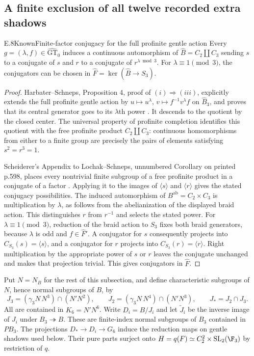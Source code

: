 \subsection{A finite exclusion of all twelve recorded extra shadows}

\begin{statement}{E.8}{Known}{Finite-factor conjugacy for the full profinite gentle action}
Every $g=(\lambda,f)\in\widehat{\mathrm{GT}}_0$ induces a continuous
automorphism of $\widehat B=C_2\amalg C_3$ sending $s$ to a conjugate
of $s$ and $r$ to a conjugate of $r^{\lambda\bmod3}$.
For $\lambda\equiv1\pmod3$, the conjugators can be chosen in
$\widehat F=\ker(\widehat B\to S_3)$.
\end{statement}
\begin{proof}
Harbater--Schneps, Proposition 4, proof of $(i)\Rightarrow(iii)$,
explicitly extends the full profinite gentle action by
$u\mapsto u^\lambda$, $v\mapsto f^{-1}v^\lambda f$ on
$\widehat B_3$, and proves that its central generator goes to its
$\lambda$th power \cite{DE_HarbaterSchneps2000}.
It descends to the quotient by the closed center. The universal
property of profinite completion identifies this quotient with the
free profinite product $C_2\amalg C_3$: continuous homomorphisms
from either to a finite group are precisely the pairs of elements
satisfying $s^2=r^3=1$.

Scheiderer's Appendix to Lochak--Schneps, unnumbered Corollary on
printed p.598, places every nontrivial finite subgroup of a free
profinite product in a conjugate of a factor
\cite{DE_LochakSchneps1997}. Applying it to the images of
$\langle s\rangle$ and $\langle r\rangle$ gives the stated conjugacy
possibilities. The induced automorphism of
$B^{\mathrm{ab}}=C_2\times C_3$ is multiplication by $\lambda$,
as follows from the abelianization of the displayed braid action.
This distinguishes $r$ from $r^{-1}$ and selects the stated power.
For $\lambda\equiv1\pmod3$, reduction of the braid action to $S_3$
fixes both braid generators, because $\lambda$ is odd and
$f\in\widehat F'$. A conjugator for $s$ consequently projects into
$C_{S_3}(s)=\langle s\rangle$, and a conjugator for $r$ projects
into $C_{S_3}(r)=\langle r\rangle$. Right multiplication by the
appropriate power of $s$ or $r$ leaves the conjugate unchanged and
makes that projection trivial. This gives conjugators in $\widehat F$.
\end{proof}

Put $N=N_B$ for the rest of this subsection, and define characteristic
subgroups of $N$, hence normal subgroups of $B$, by
\[
 J_3=(\gamma_3N\,N^3)\cap(N'N^2),\qquad
 J_2=(\gamma_3N\,N^4)\cap(N'N^3),\qquad
 J_*=J_2\cap J_3.
\]
All are contained in $K_6=N'N^6$. Write $D_i=B/J_i$ and let
$\widetilde J_i$ be the inverse image of $J_i$ under $B_3\twoheadrightarrow B$.
These are finite-index normal subgroups of $B_3$ contained in $PB_3$.
The projections $D_*\to D_i\to G_6$ induce the reduction maps on
gentle shadows used below. Their pure parts surject onto
$H=q(F)\simeq C_2^2\times\mathrm{SL}_2(\F_3)$ by restriction of $q$.

